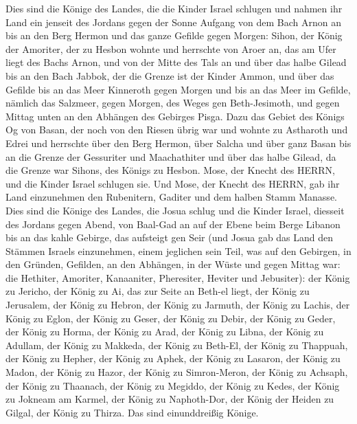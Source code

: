  Dies sind die Könige des Landes, die die Kinder Israel
schlugen und nahmen ihr Land ein jenseit des Jordans gegen der Sonne
Aufgang von dem Bach Arnon an bis an den Berg Hermon und das ganze
Gefilde gegen Morgen:  Sihon, der König der Amoriter, der zu
Hesbon wohnte und herrschte von Aroer an, das am Ufer liegt des Bachs
Arnon, und von der Mitte des Tals an und über das halbe Gilead bis an
den Bach Jabbok, der die Grenze ist der Kinder Ammon,  und
über das Gefilde bis an das Meer Kinneroth gegen Morgen und bis an das
Meer im Gefilde, nämlich das Salzmeer, gegen Morgen, des Weges gen
Beth-Jesimoth, und gegen Mittag unten an den Abhängen des Gebirges
Pisga.  Dazu das Gebiet des Königs Og von Basan, der noch
von den Riesen übrig war und wohnte zu Astharoth und Edrei 
und herrschte über den Berg Hermon, über Salcha und über ganz Basan bis
an die Grenze der Gessuriter und Maachathiter und über das halbe Gilead,
da die Grenze war Sihons, des Königs zu Hesbon.  Mose, der
Knecht des HERRN, und die Kinder Israel schlugen sie. Und Mose, der
Knecht des HERRN, gab ihr Land einzunehmen den Rubenitern, Gaditer und
dem halben Stamm Manasse.  Dies sind die Könige des Landes,
die Josua schlug und die Kinder Israel, diesseit des Jordans gegen
Abend, von Baal-Gad an auf der Ebene beim Berge Libanon bis an das kahle
Gebirge, das aufsteigt gen Seir (und Josua gab das Land den Stämmen
Israels einzunehmen, einem jeglichen sein Teil,  was auf den
Gebirgen, in den Gründen, Gefilden, an den Abhängen, in der Wüste und
gegen Mittag war: die Hethiter, Amoriter, Kanaaniter, Pheresiter,
Heviter und Jebusiter):  der König zu Jericho, der König zu
Ai, das zur Seite an Beth-el liegt,  der König zu
Jerusalem, der König zu Hebron,  der König zu Jarmuth, der
König zu Lachis,  der König zu Eglon, der König zu Geser,
 der König zu Debir, der König zu Geder,  der
König zu Horma, der König zu Arad,  der König zu Libna, der
König zu Adullam,  der König zu Makkeda, der König zu
Beth-El,  der König zu Thappuah, der König zu Hepher,
 der König zu Aphek, der König zu Lasaron, 
der König zu Madon, der König zu Hazor,  der König zu
Simron-Meron, der König zu Achsaph,  der König zu Thaanach,
der König zu Megiddo,  der König zu Kedes, der König zu
Jokneam am Karmel,  der König zu Naphoth-Dor, der König der
Heiden zu Gilgal,  der König zu Thirza. Das sind
einunddreißig Könige.

